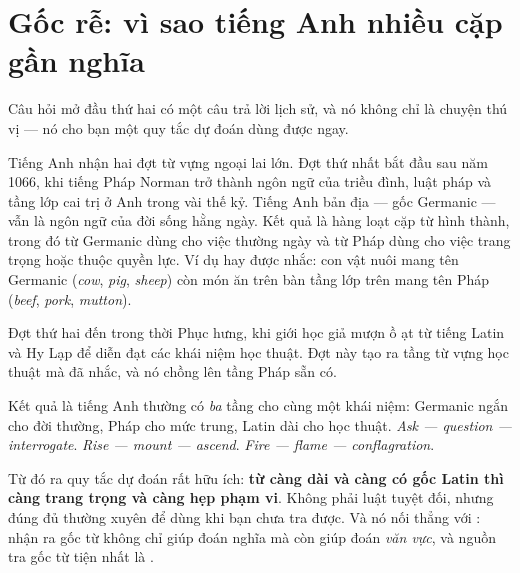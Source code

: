 \documentclass[../../english.tex]{subfiles}
\begin{document}
\begin{tuvung}
\end{tuvung}

\section{Gốc rễ: vì sao tiếng Anh nhiều cặp gần nghĩa}

Câu hỏi mở đầu thứ hai có một câu trả lời lịch sử, và nó không chỉ là chuyện thú vị --- nó cho bạn một quy tắc dự đoán dùng được ngay.

Tiếng Anh nhận hai đợt từ vựng ngoại lai lớn. Đợt thứ nhất bắt đầu sau năm 1066, khi tiếng Pháp Norman trở thành ngôn ngữ của triều đình, luật pháp và tầng lớp cai trị ở Anh trong vài thế kỷ. Tiếng Anh bản địa --- gốc Germanic --- vẫn là ngôn ngữ của đời sống hằng ngày. Kết quả là hàng loạt cặp từ hình thành, trong đó từ Germanic dùng cho việc thường ngày và từ Pháp dùng cho việc trang trọng hoặc thuộc quyền lực. Ví dụ hay được nhắc: con vật nuôi mang tên Germanic (\emph{cow}, \emph{pig}, \emph{sheep}) còn món ăn trên bàn tầng lớp trên mang tên Pháp (\emph{beef}, \emph{pork}, \emph{mutton}).

Đợt thứ hai đến trong thời Phục hưng, khi giới học giả mượn ồ ạt từ tiếng Latin và Hy Lạp để diễn đạt các khái niệm học thuật. Đợt này tạo ra tầng từ vựng học thuật mà  đã nhắc, và nó chồng lên tầng Pháp sẵn có.

Kết quả là tiếng Anh thường có \emph{ba} tầng cho cùng một khái niệm: Germanic ngắn cho đời thường, Pháp cho mức trung, Latin dài cho học thuật. \emph{Ask --- question --- interrogate}. \emph{Rise --- mount --- ascend}. \emph{Fire --- flame --- conflagration}.

Từ đó ra quy tắc dự đoán rất hữu ích: \textbf{từ càng dài và càng có gốc Latin thì càng trang trọng và càng hẹp phạm vi}. Không phải luật tuyệt đối, nhưng đúng đủ thường xuyên để dùng khi bạn chưa tra được. Và nó nối thẳng với : nhận ra gốc từ không chỉ giúp đoán nghĩa mà còn giúp đoán \emph{văn vực}, và nguồn tra gốc từ tiện nhất là \cite{etymonline}.
\end{document}
